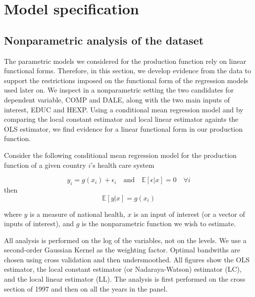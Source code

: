 \documentclass[12pt,a4paper]{article}\usepackage[]{graphicx}\usepackage[]{color}
\begin{document}



%
%

\section{Model specification}
\subsection{Nonparametric analysis of the dataset}
The parametric models we considered for the production function rely on linear functional forms. Therefore, in this section, we develop evidence from the data to support the restrictions imposed on the functional form of the regression models used later on. We inspect in a nonparametric setting the two candidates for dependent variable, COMP and DALE, along with the two main inputs of interest, EDUC and HEXP. Using a conditional mean regression model and by comparing the local constant estimator and local linear estimator againts the OLS estimator, we find evidence for a linear functional form in our production function. 
 
Consider the following conditional mean regression model for the production function of a given country $i$'s health care system

$$
y_i = g(x_i) + \epsilon_i \quad \textrm{and} \quad \mathbb{E}[\epsilon|x]=0 \quad \forall i
$$
then
$$
\mathbb{E}[y|x]=g(x_i)
$$

where $y$ is a measure of national health, $x$ is an input of interest (or a vector of inputs of interest), and $g$ is the nonparametric function we wish to estimate.
 
All analysis is performed on the log of the variables, not on the levels. We use a second-order Gaussian Kernel as the weighting factor. Optimal bandwiths are chosen using cross validation and then undersmoothed. All figures show the OLS estimator, the local constant estimator (or Nadaraya-Watson) estimator (LC), and the local linear estimator (LL). The analysis is first performed on the cross section of 1997 and then on all the years in the panel.
\end{document}
